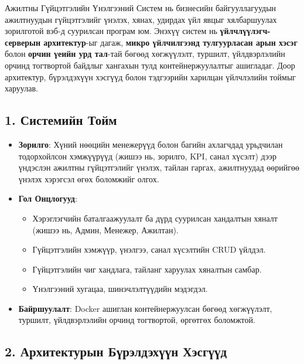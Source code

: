 
Ажилтны Гүйцэтгэлийн Үнэлгээний Систем нь бизнесийн байгууллагуудын ажилтнуудын гүйцэтгэлийг үнэлэх, хянах, удирдах үйл явцыг хялбаршуулах зорилготой вэб-д суурилсан програм юм. Энэхүү систем нь \textbf{үйлчлүүлэгч-серверын архитектур}-ыг дагаж, \textbf{микро үйлчилгээнд тулгуурласан арын хэсэг} болон \textbf{орчин үеийн урд тал}-тай бөгөөд хөгжүүлэлт, туршилт, үйлдвэрлэлийн орчинд тогтвортой байдлыг хангахын тулд контейнержуулалтыг ашигладаг. Доор архитектур, бүрэлдэхүүн хэсгүүд болон тэдгээрийн харилцан үйлчлэлийн тоймыг харуулав.

\subsection*{1. Системийн Тойм}
\begin{itemize}
    \item \textbf{Зорилго}: Хүний нөөцийн менежерүүд болон багийн ахлагчдад урьдчилан тодорхойлсон хэмжүүрүүд (жишээ нь, зорилго, KPI, санал хүсэлт) дээр үндэслэн ажилтны гүйцэтгэлийг үнэлэх, тайлан гаргах, ажилтнуудад өөрийгөө үнэлэх хэрэгсэл өгөх боломжийг олгох.
    \item \textbf{Гол Онцлогууд}:
    \begin{itemize}
        \item Хэрэглэгчийн баталгаажуулалт ба дүрд суурилсан хандалтын хяналт (жишээ нь, Админ, Менежер, Ажилтан).
        \item Гүйцэтгэлийн хэмжүүр, үнэлгээ, санал хүсэлтийн CRUD үйлдэл.
        \item Гүйцэтгэлийн чиг хандлага, тайланг харуулах хяналтын самбар.
        \item Үнэлгээний хугацаа, шинэчлэлтүүдийн мэдэгдэл.
    \end{itemize}
    \item \textbf{Байршуулалт}: Docker ашиглан контейнержуулсан бөгөөд хөгжүүлэлт, туршилт, үйлдвэрлэлийн орчинд тогтвортой, өргөтгөх боломжтой.
\end{itemize}

\subsection*{2. Архитектурын Бүрэлдэхүүн Хэсгүүд}

